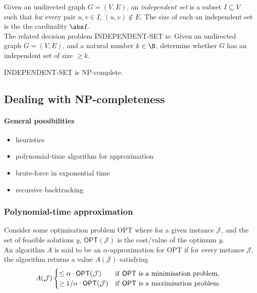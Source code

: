 \documentclass{article}
\begin{document}
\begin{definition}
	Given an undirected graph $G=(V,E)$, an \emph{independent set} is
	a subset $I\subseteq V$ such that for every pair $u,v\in I$,
	$(u,v)\not\in E$. The size of such an independent set is the
	the cardinality $\abs I$.\\
	The related decision problem INDEPENDENT-SET is: Given an undirected graph $G=(V,E)$,
	and a natural number $k\in\N$, determine whether $G$ has an independent
	set of size $\geq k$.
\end{definition}

\begin{proposition}
	INDEPENDENT-SET is NP-complete.
\end{proposition}


\subsection{Dealing with NP-completeness}


\paragraph{General possibilities}
\begin{itemize}
	\item heuristics
	\item polynomial-time algorithm for approximation
	\item brute-force in exponential time
	\item recursive backtracking
\end{itemize}

\subsubsection{Polynomial-time approximation}

\begin{definition}
	Consider some optimisation problem \textsf{OPT} where for a given
	instance $\mathcal{J}$, and the set of feasible solutions $y$,
	$\textsf{OPT}(\mathcal{J})$ is the cost/value of the optimum $y$.\\
	An algorithm $A$ is said to be an $\alpha$-approximation for \textsf{OPT}
	if for every instance $\mathcal{J}$, the algorithm returns a value
	$A(\mathcal{J})$ satisfying
	\begin{align*}
		A(\mathcal{J}) \begin{cases}
			\leq \alpha \cdot \textsf{OPT}(\mathcal{J})   & \text{if \textsf{OPT} is a minimisation problem}, \\
			\geq 1/\alpha \cdot \textsf{OPT}(\mathcal{J}) & \text{if \textsf{OPT} is a maximisation problem}.
		\end{cases}
	\end{align*}
\end{definition}
\end{document}
